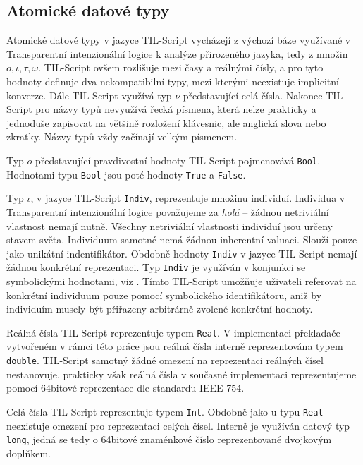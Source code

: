 \subsection{Atomické datové typy}

Atomické datové typy v jazyce TIL-Script vycházejí z výchozí báze využívané v Transparentní
intenzionální logice k analýze přirozeného jazyka, tedy z množin ${o, \iota, \tau, \omega}$. TIL-Script ovšem
rozlišuje mezi časy a reálnými čísly, a pro tyto hodnoty definuje dva nekompatibilní typy, mezi
kterými neexistuje implicitní konverze. Dále TIL-Script využívá typ $\nu$ představující celá
čísla. Nakonec TIL-Script pro názvy typů nevyužívá řecká písmena, která nelze prakticky a jednoduše
zapisovat na většině rozložení klávesnic, ale anglická slova nebo zkratky. Názvy typů vždy začínají
velkým písmenem.

Typ $o$ představující pravdivostní hodnoty TIL-Script pojmenovává \lstinline{Bool}. Hodnotami typu
\lstinline{Bool} jsou poté hodnoty \lstinline{True} a \lstinline{False}.

Typ $\iota$, v jazyce TIL-Script \lstinline{Indiv}, reprezentuje množinu individuí. Individua
v Transparentní intenzionální logice považujeme za \textit{holá} -- žádnou netriviální vlastnost
nemají nutně\cite{til-duzi}. Všechny netriviální vlastnosti individuí jsou určeny stavem světa.
Individuum samotné nemá žádnou inherentní valuaci. Slouží pouze jako unikátní indentifikátor.
Obdobně hodnoty \lstinline{Indiv} v jazyce TIL-Script nemají žádnou konkrétní reprezentaci. Typ
\lstinline{Indiv} je využíván v konjunkci se symbolickými hodnotami, viz .
Tímto TIL-Script umožňuje uživateli referovat na konkrétní individuum pouze pomocí symbolického
identifikátoru, aniž by individuím musely být přiřazeny arbitrárně zvolené konkrétní hodnoty.

Reálná čísla TIL-Script reprezentuje typem \lstinline{Real}. V implementaci překladače vytvořeném
v rámci této práce jsou reálná čísla interně reprezentována typem \lstinline{double}. TIL-Script
samotný žádné omezení na reprezentaci reálných čísel nestanovuje, prakticky však reálná čísla
v současné implementaci reprezentujeme pomocí 64bitové reprezentace dle standardu IEEE 754.

Celá čísla TIL-Script reprezentuje typem \lstinline{Int}. Obdobně jako u typu \lstinline{Real}
neexistuje omezení pro reprezentaci celých čísel. Interně je využíván datový typ \lstinline{long},
jedná se tedy o 64bitové znaménkové číslo reprezentované dvojkovým doplňkem.

